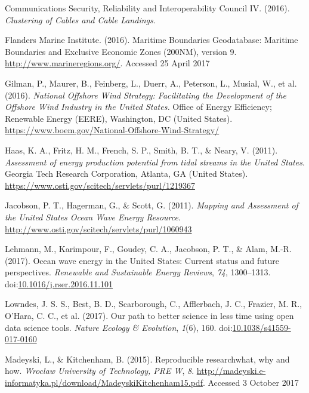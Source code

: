 \documentclass[]{article}
\begin{document}
\leavevmode\hypertarget{ref-communicationssecurityreliabilityandinteroperabilitycounciliv_clustering_2016}{}%
Communications Security, Reliability and Interoperability Council IV.
(2016). \emph{Clustering of Cables and Cable Landings}.

\leavevmode\hypertarget{ref-flandersmarineinstitute_maritime_2016}{}%
Flanders Marine Institute. (2016). Maritime Boundaries Geodatabase:
Maritime Boundaries and Exclusive Economic Zones (200NM), version 9.
\url{http://www.marineregions.org/}. Accessed 25 April 2017

\leavevmode\hypertarget{ref-gilman_national_2016}{}%
Gilman, P., Maurer, B., Feinberg, L., Duerr, A., Peterson, L., Musial,
W., et al. (2016). \emph{National Offshore Wind Strategy: Facilitating
the Development of the Offshore Wind Industry in the United States.}
Office of Energy Efficiency; Renewable Energy (EERE), Washington, DC
(United States).
\url{https://www.boem.gov/National-Offshore-Wind-Strategy/}

\leavevmode\hypertarget{ref-haas_assessment_2011}{}%
Haas, K. A., Fritz, H. M., French, S. P., Smith, B. T., \& Neary, V.
(2011). \emph{Assessment of energy production potential from tidal
streams in the United States}. Georgia Tech Research Corporation,
Atlanta, GA (United States).
\url{https://www.osti.gov/scitech/servlets/purl/1219367}

\leavevmode\hypertarget{ref-Jacobson_Hagerman_Scott_2011}{}%
Jacobson, P. T., Hagerman, G., \& Scott, G. (2011). \emph{Mapping and
Assessment of the United States Ocean Wave Energy Resource}.
\url{http://www.osti.gov/scitech/servlets/purl/1060943}

\leavevmode\hypertarget{ref-lehmann_ocean_2017a}{}%
Lehmann, M., Karimpour, F., Goudey, C. A., Jacobson, P. T., \& Alam,
M.-R. (2017). Ocean wave energy in the United States: Current status and
future perspectives. \emph{Renewable and Sustainable Energy Reviews},
\emph{74}, 1300--1313.
doi:\href{https://doi.org/10.1016/j.rser.2016.11.101}{10.1016/j.rser.2016.11.101}

\leavevmode\hypertarget{ref-lowndes_our_2017}{}%
Lowndes, J. S. S., Best, B. D., Scarborough, C., Afflerbach, J. C.,
Frazier, M. R., O'Hara, C. C., et al. (2017). Our path to better science
in less time using open data science tools. \emph{Nature Ecology \&
Evolution}, \emph{1}(6), 160.
doi:\href{https://doi.org/10.1038/s41559-017-0160}{10.1038/s41559-017-0160}

\leavevmode\hypertarget{ref-madeyski_reproducible_2015}{}%
Madeyski, L., \& Kitchenham, B. (2015). Reproducible researchwhat, why
and how. \emph{Wroclaw University of Technology, PRE W}, \emph{8}.
\url{http://madeyski.e-informatyka.pl/download/MadeyskiKitchenham15.pdf}.
Accessed 3 October 2017
\end{document}
